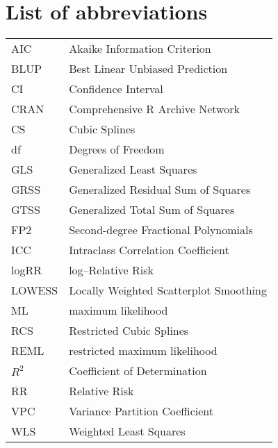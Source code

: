 %

\chapter*{List of abbreviations}
\begin{tabular}{ll}

AIC & Akaike Information Criterion \\
BLUP & Best Linear Unbiased Prediction \\
CI & Confidence Interval \\
CRAN & Comprehensive R Archive Network \\
CS & Cubic Splines \\
df & Degrees of Freedom \\
GLS & Generalized Least Squares \\
GRSS & Generalized Residual Sum of Squares \\
GTSS & Generalized Total Sum of Squares \\
FP2 & Second-degree Fractional Polynomials \\
ICC & Intraclass Correlation Coefficient \\
logRR & log--Relative Risk \\
LOWESS & Locally Weighted Scatterplot Smoothing \\
ML & maximum likelihood \\
RCS & Restricted Cubic Splines \\
REML & restricted maximum likelihood \\
$R^2$ & Coefficient of Determination \\
RR & Relative Risk \\
VPC & Variance Partition Coefficient \\
WLS & Weighted Least Squares


\end{tabular}